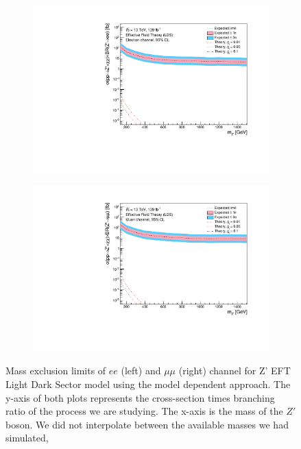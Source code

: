 \documentclass[12pt, a4paper]{book}
\begin{document}
\begin{figure}[!ht]
	\centering
   \begin{subfigure}[b]{0.49\textwidth}
      \centering
      \includegraphics[width=1\textwidth]{Limits/EFT_LDS/mass_exclusion_ee.pdf}
      \end{subfigure}
   \hfill
   \begin{subfigure}[b]{0.49\textwidth}
      \centering
      \includegraphics[width=1\textwidth]{Limits/EFT_LDS/mass_exclusion_uu.pdf}
      \end{subfigure}
   \caption[Expected mass exclusion limits of $ee$ and $\mu\mu$ channel for Z' EFT LDS model using the model dependent approach]{Mass exclusion limits of $ee$ (left) and $\mu\mu$ (right) channel for Z' EFT Light Dark Sector model using the model dependent approach. The y-axis of both plots represents the cross-section times branching ratio of the process we are studying. The x-axis is the mass of the $Z'$ boson. We did not interpolate between the available masses we had simulated, 
}
\end{figure}
\end{document}
